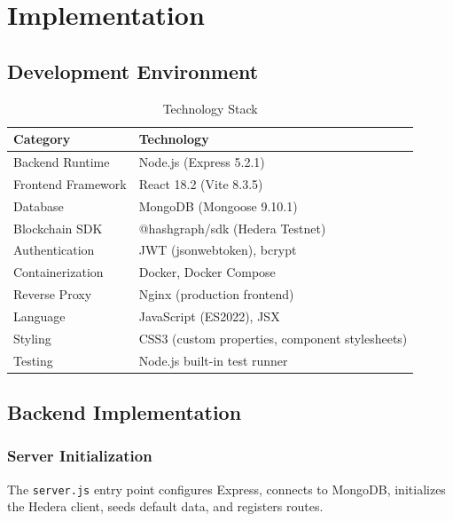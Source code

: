 \chapter{Implementation}
\label{ch:implementation}

\section{Development Environment}
\label{sec:dev-env}

\begin{table}[H]
\centering
\caption{Technology Stack}
\label{tab:tech-stack}
\begin{tabular}{@{}ll@{}}
\toprule
\textbf{Category} & \textbf{Technology} \\
\midrule
Backend Runtime & Node.js (Express 5.2.1) \\
Frontend Framework & React 18.2 (Vite 8.3.5) \\
Database & MongoDB (Mongoose 9.10.1) \\
Blockchain SDK & @hashgraph/sdk (Hedera Testnet) \\
Authentication & JWT (jsonwebtoken), bcrypt \\
Containerization & Docker, Docker Compose \\
Reverse Proxy & Nginx (production frontend) \\
Language & JavaScript (ES2022), JSX \\
Styling & CSS3 (custom properties, component stylesheets) \\
Testing & Node.js built-in test runner \\
\midrule
\end{tabular}
\end{table}

\section{Backend Implementation}
\label{sec:backend-impl}

\subsection{Server Initialization}
\label{sec:server-init}

The \texttt{server.js} entry point configures Express, connects to MongoDB, initializes
the Hedera client, seeds default data, and registers routes.


